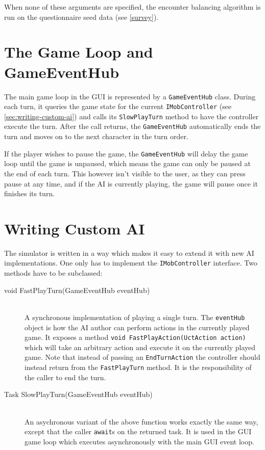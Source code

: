 When none of these arguments are specified, the encounter balancing algorithm is run on the questionnaire seed data (see \autoref{survey}).

\section{The Game Loop and GameEventHub}

The main game loop in the GUI is represented by a \verb|GameEventHub| class. During each turn, it queries the game state for the current \verb|IMobController| (see \autoref{sec:writing-custom-ai}) and calls its \verb|SlowPlayTurn| method to have the controller execute the turn. After the call returns, the \verb|GameEventHub| automatically ends the turn and moves on to the next character in the turn order.

If the player wishes to pause the game, the \verb|GameEventHub| will delay the game loop until the game is unpaused, which means the game can only be paused at the end of each turn. This however isn't visible to the user, as they can press pause at any time, and if the AI is currently playing, the game will pause once it finishes its turn.

\section{Writing Custom AI}
\label{sec:writing-custom-ai}

The simulator is written in a way which makes it easy to extend it with new AI implementations. One only has to implement the \verb|IMobController| interface. Two methods have to be subclassed:

\begin{description}
	\item[void FastPlayTurn(GameEventHub eventHub)] \hfill \\
	A synchronous implementation of playing a single turn. The \verb|eventHub| object is how the AI author can perform actions in the currently played game. It exposes a method \verb|void FastPlayAction(UctAction action)| which will take an arbitrary action and execute it on the currently played game. Note that instead of passing an \verb|EndTurnAction| the controller should instead return from the \verb|FastPlayTurn| method. It is the responsibility of the caller to end the turn.
	
	\item[Task SlowPlayTurn(GameEventHub eventHub)] \hfill \\
	An asychronous variant of the above function works exactly the same way, except that the caller \verb|await|s on the returned task. It is used in the GUI game loop which executes asynchronously with the main GUI event loop.
\end{description}

